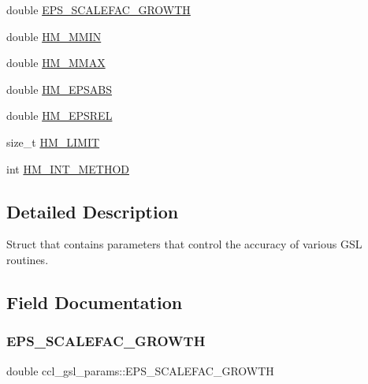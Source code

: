 \begin{DoxyCompactItemize}
\item 
double \mbox{\hyperlink{structccl__gsl__params_a08caa9ee529f89991a72d9affc06eab0}{E\+P\+S\+\_\+\+S\+C\+A\+L\+E\+F\+A\+C\+\_\+\+G\+R\+O\+W\+TH}}
\item 
double \mbox{\hyperlink{structccl__gsl__params_af4077bd85d8e328f8caa936315762f63}{H\+M\+\_\+\+M\+M\+IN}}
\item 
double \mbox{\hyperlink{structccl__gsl__params_a91b1694454ac995cc12454013c74e78e}{H\+M\+\_\+\+M\+M\+AX}}
\item 
double \mbox{\hyperlink{structccl__gsl__params_a22f0df5b441c4dfa09bafd78a3490d0e}{H\+M\+\_\+\+E\+P\+S\+A\+BS}}
\item 
double \mbox{\hyperlink{structccl__gsl__params_a548f46a17baa92292508a803c7b71c53}{H\+M\+\_\+\+E\+P\+S\+R\+EL}}
\item 
size\+\_\+t \mbox{\hyperlink{structccl__gsl__params_ab870aeb5797badcd0fb0bf20158244ec}{H\+M\+\_\+\+L\+I\+M\+IT}}
\item 
int \mbox{\hyperlink{structccl__gsl__params_a82c788c1408cd23fcb16bb737a7b9b4f}{H\+M\+\_\+\+I\+N\+T\+\_\+\+M\+E\+T\+H\+OD}}
\end{DoxyCompactItemize}


\subsection{Detailed Description}
Struct that contains parameters that control the accuracy of various G\+SL routines. 

\subsection{Field Documentation}
\mbox{\label{structccl__gsl__params_a08caa9ee529f89991a72d9affc06eab0}} 
\subsubsection{\texorpdfstring{E\+P\+S\+\_\+\+S\+C\+A\+L\+E\+F\+A\+C\+\_\+\+G\+R\+O\+W\+TH}{EPS\_SCALEFAC\_GROWTH}}
{\footnotesize\ttfamily double ccl\+\_\+gsl\+\_\+params\+::\+E\+P\+S\+\_\+\+S\+C\+A\+L\+E\+F\+A\+C\+\_\+\+G\+R\+O\+W\+TH}


